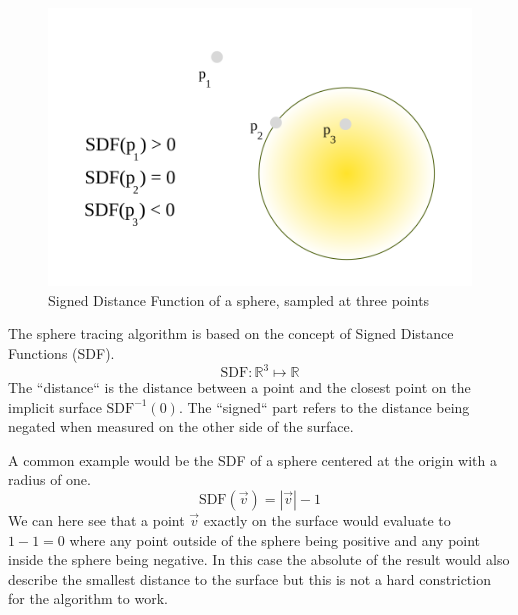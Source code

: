 		\begin{figure}
			\begin{flushright}
				\includegraphics[width=0.9\linewidth]{figure/SDF} 
			\end{flushright}
			\caption{ Signed Distance Function of a sphere, sampled at three points}
			\vspace{40pt}
		\end{figure}

		The sphere tracing algorithm is based on the concept of Signed Distance
		Functions (SDF).  $$\text{SDF}:\mathbb{R}^{3}\mapsto\mathbb{R}$$ The
		``distance`` is the distance between a point and the closest point on the
		implicit surface $\text{SDF}^{-1}(0)$. The ``signed`` part refers to the
		distance being negated when measured on the other side of the surface. 

		A common example would be the SDF of a sphere centered at the origin with a
		radius of one. $$\text{SDF}(\vec{v}) = |\vec{v}| - 1$$ We can here see that
		a point $\vec{v}$ exactly on the surface would evaluate to $1 - 1 = 0$
		where any point outside of the sphere being positive and any point inside
		the sphere being negative. In this case the absolute of the result would
		also describe the smallest distance to the surface but this is not a hard
		constriction for the algorithm to work.

